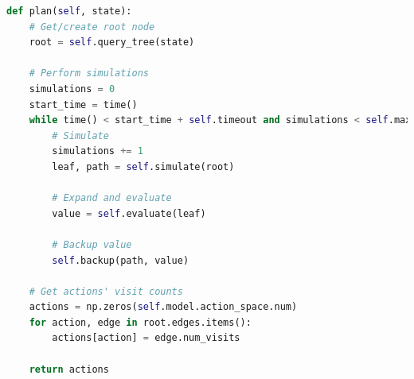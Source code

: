 \noindent\begin{minipage}{\textwidth} %
\begin{lstlisting}[language=Python]
def plan(self, state):
    # Get/create root node
    root = self.query_tree(state)

    # Perform simulations
    simulations = 0
    start_time = time()
    while time() < start_time + self.timeout and simulations < self.max_simulations:
        # Simulate
        simulations += 1
        leaf, path = self.simulate(root)

        # Expand and evaluate
        value = self.evaluate(leaf)

        # Backup value
        self.backup(path, value)

    # Get actions' visit counts
    actions = np.zeros(self.model.action_space.num)
    for action, edge in root.edges.items():
        actions[action] = edge.num_visits

    return actions
\end{lstlisting}
\end{minipage}

